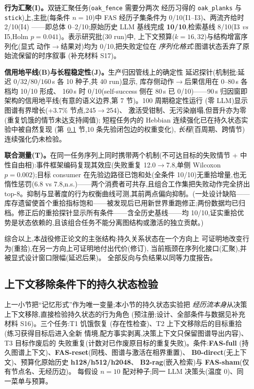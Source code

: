 \documentclass[10pt,a4paper]{ctexart}
\begin{document}
\textbf{行为汇聚(I)。}双链汇聚任务(\texttt{oak\_fence} 需要分两次
经历习得的 \texttt{oak\_planks} 与 \texttt{stick})上,主批(每条件
$n{=}10$)中 FAS 经历子集条件为 0/10(I1--I3)、两流齐给时 2/10(I4)
——即总体 0--2/10;原始历史 LLM 基线完成 \textbf{10/10},检索基线
8/10(I3 \emph{vs} I5,Holm $p{=}0.041$)。表示研究批(30 run)中,
上下文预算($k{=}16,32$)与结构增富序列化(显式
动作$\rightarrow$结果对)均为 0/10,把失败定位在
\emph{序列化格式}:图谱状态丢弃了原始流保留的时序叙事
(补充材料 S17)。

\textbf{信用地平线(B)与长程稳定性(J)。}生产归因管线上的确定性
延迟探针(机制批:延迟 $0/32/80/160$\,s 各 10 种子,共 40 run)显示,
库存侧动作$\rightarrow$后果信用在 0--80\,s 各档均 10/10 形成、
160\,s 时 0/10(self-success 侧在 80\,s 已 0/10)——90\,s 归因窗即
架构的信用地平线(有意的语义边界,第 7 节)。100 周期稳定性运行
(零 LLM)显示图谱有界增长($+3.7\%$ 节点,245$\rightarrow$254)、
激活受钳制、无污染崩塌,但晋升亦为零(重复饥饿的情节未达支持阈值);
短程任务内的 Hebbian 连续强化已在持久状态实验中被自然复现
(第~\ref{sec:res-psa} 节,10 条先验闭包边的权重变化),
\emph{长程}(百周期、跨情节)连续强化仍未检验。

\textbf{联合测量(T)。}在同一任务序列上同时携带两个机制(不可达目标的失败情节 + 中性自由相):事件框架编码复现其效应(失败重复 12.0$\rightarrow$7.8,单侧 Wilcoxon $p{=}0.002$);目标 consumer 在先验边路径已饱和处(全条件 10/10)无重拾增量,也无惰性惩罚(6.8 vs 7.8,n.s.)——两个消费者可共存,且组合工作集把失败动作完全挤出 top-8。抑制与显著度的行为权衡曲线可测,其前两点偏向抑制。(一处设计缺陷——库存遗留使首个重拾指标饱和——被发现后已用新世界重跑修正;两份数据均已归档。修正后的重拾探针显示所有条件——含全历史基线——均 10/10,证实重拾优势是状态依赖的,且该组合任务不能分离图结构或激活的独立贡献。)

综合以上,本战役修正论文的主张结构:持久关系状态在一个方向上
可证明地改变行为(重拾),在另一方向上可证明地付出代价(修订),
当前瓶颈在序列化接口(汇聚),并被显式设计窗口限幅(延迟后果)。
全部反向与负结果以同等力度报告。

\subsection{上下文移除条件下的持久状态检验}
\label{sec:res-psa}

上一小节把``记忆形式''作为唯一变量;本小节的持久状态实验把
\emph{经历流本身}从决策上下文移除,直接检验持久状态的行为角色
(预注册;设计、全部条件与数据见补充材料 S16)。三个任务:T1 饥饿恢复
(存在性检查)、T2 上下文移除后的目标重拾(练习获得目标后进入全新
情境,配方事实剥离,决策上下文只保留图谱导出内容)、T3 目标作废后的
失败重复(计数对已作废原目标的重复失败)。条件:\textbf{FAS-full}
(持久图谱上下文)、\textbf{FAS-reset}(同栈、图谱与激活在相界重置)、
\textbf{B0-direct}(无上下文)、预算化原始历史 \textbf{h128/h512/h2048}、
\textbf{B2-rag}(嵌入检索)与 \textbf{FAS-sham}(仅有节点名、无经历边)。
每假设 $n{=}10$ 配对种子;同一 LLM 决策头(温度 0)、同一菜单与预算。
\end{document}
